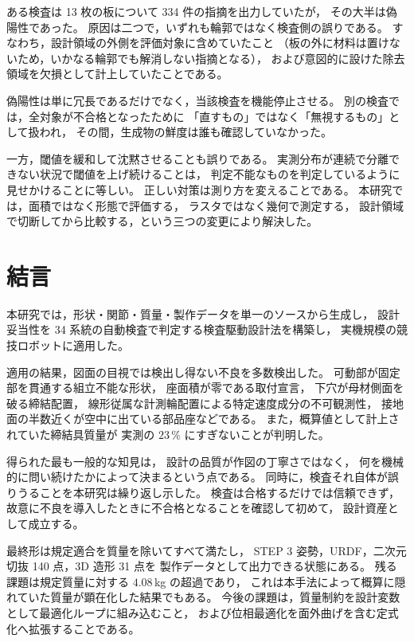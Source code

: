 \documentclass[a4paper,10pt,twocolumn]{ltjsarticle}
\begin{document}
ある検査は 13 枚の板について 334 件の指摘を出力していたが，
その大半は偽陽性であった。
原因は二つで，いずれも輪郭ではなく検査側の誤りである。
すなわち，設計領域の外側を評価対象に含めていたこと
（板の外に材料は置けないため，いかなる輪郭でも解消しない指摘となる），
および意図的に設けた除去領域を欠損として計上していたことである。

偽陽性は単に冗長であるだけでなく，当該検査を機能停止させる。
別の検査では，全対象が不合格となったために
「直すもの」ではなく「無視するもの」として扱われ，
その間，生成物の鮮度は誰も確認していなかった。

一方，閾値を緩和して沈黙させることも誤りである。
実測分布が連続で分離できない状況で閾値を上げ続けることは，
判定不能なものを判定しているように見せかけることに等しい。
正しい対策は測り方を変えることである。
本研究では，面積ではなく形態で評価する，
ラスタではなく幾何で測定する，
設計領域で切断してから比較する，という三つの変更により解決した。

\section{結言}

本研究では，形状・関節・質量・製作データを単一のソースから生成し，
設計妥当性を 34 系統の自動検査で判定する検査駆動設計法を構築し，
実機規模の競技ロボットに適用した。

適用の結果，図面の目視では検出し得ない不良を多数検出した。
可動部が固定部を貫通する組立不能な形状，
座面積が零である取付宣言，
下穴が母材側面を破る締結配置，
線形従属な計測輪配置による特定速度成分の不可観測性，
接地面の半数近くが空中に出ている部品座などである。
また，概算値として計上されていた締結具質量が
実測の $23\,\%$ にすぎないことが判明した。

得られた最も一般的な知見は，
設計の品質が作図の丁寧さではなく，
何を機械的に問い続けたかによって決まるという点である。
同時に，検査それ自体が誤りうることを本研究は繰り返し示した。
検査は合格するだけでは信頼できず，
故意に不良を導入したときに不合格となることを確認して初めて，
設計資産として成立する。

最終形は規定適合を質量を除いてすべて満たし，
STEP 3 姿勢，URDF，二次元切抜 140 点，3D 造形 31 点を
製作データとして出力できる状態にある。
残る課題は規定質量に対する $4.08\,$kg の超過であり，
これは本手法によって概算に隠れていた質量が顕在化した結果でもある。
今後の課題は，質量制約を設計変数として最適化ループに組み込むこと，
および位相最適化を面外曲げを含む定式化へ拡張することである。
\end{document}
